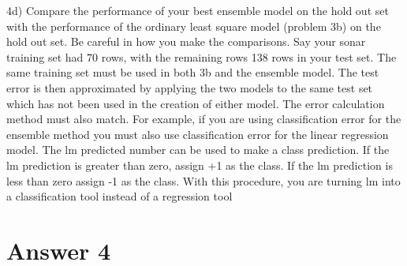 \documentclass{article}
\begin{document}
4d) Compare the performance of your best ensemble model on the hold out
set with the performance of the ordinary least square model (problem 3b) on
the hold out set. Be careful in how you make the comparisons. Say your
sonar training set had 70 rows, with the remaining rows 138 rows in your test
set. The same training set must be used in both 3b and the ensemble model.
The test error is then approximated by applying the two models to the same
test set which has not been used in the creation of either model. The error
calculation method must also match. For example, if you are using
classification error for the ensemble method you must also use classification
error for the linear regression model. The lm predicted number can be used
to make a class prediction. If the lm prediction is greater than zero, assign +1
as the class. If the lm prediction is less than zero assign -1 as the class.
With this procedure, you are turning lm into a classification tool instead of a
regression tool

\section*{Answer  4}
\end{document}
